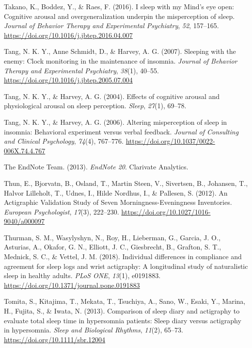\documentclass[
]{article}
\newlength{\cslhangindent}
\newenvironment{CSLReferences}[2] %
 {\begin{list}{}{%
  \setlength{\itemindent}{0pt}
  \setlength{\leftmargin}{0pt}
  \setlength{\parsep}{0pt}
  \ifodd #1
   \setlength{\leftmargin}{\cslhangindent}
   \setlength{\itemindent}{-1\cslhangindent}
  \fi
  \setlength{\itemsep}{#2\baselineskip}}}
 {\end{list}}
\begin{document}
\begin{CSLReferences}{1}{0}
Takano, K., Boddez, Y., \& Raes, F. (2016). I sleep with my {Mind}'s eye open: {Cognitive} arousal and overgeneralization underpin the misperception of sleep. \emph{Journal of Behavior Therapy and Experimental Psychiatry}, \emph{52}, 157--165. \url{https://doi.org/10.1016/j.jbtep.2016.04.007}

Tang, N. K. Y., Anne Schmidt, D., \& Harvey, A. G. (2007). Sleeping with the enemy: {Clock} monitoring in the maintenance of insomnia. \emph{Journal of Behavior Therapy and Experimental Psychiatry}, \emph{38}(1), 40--55. \url{https://doi.org/10.1016/j.jbtep.2005.07.004}

Tang, N. K. Y., \& Harvey, A. G. (2004). Effects of cognitive arousal and physiological arousal on sleep perception. \emph{Sleep}, \emph{27}(1), 69--78.

Tang, N. K. Y., \& Harvey, A. G. (2006). Altering misperception of sleep in insomnia: {Behavioral} experiment versus verbal feedback. \emph{Journal of Consulting and Clinical Psychology}, \emph{74}(4), 767--776. \url{https://doi.org/10.1037/0022-006X.74.4.767}

The EndNote Team. (2013). \emph{EndNote 20}. Clarivate Analytics.

Thun, E., Bjorvatn, B., Osland, T., Martin Steen, V., Sivertsen, B., Johansen, T., Halvor Lilleholt, T., Udnes, I., Hilde Nordhus, I., \& Pallesen, S. (2012). An {Actigraphic} {Validation} {Study} of {Seven} {Morningness}-{Eveningness} {Inventories}. \emph{European Psychologist}, \emph{17}(3), 222--230. \url{https://doi.org/10.1027/1016-9040/a000097}

Thurman, S. M., Wasylyshyn, N., Roy, H., Lieberman, G., Garcia, J. O., Asturias, A., Okafor, G. N., Elliott, J. C., Giesbrecht, B., Grafton, S. T., Mednick, S. C., \& Vettel, J. M. (2018). Individual differences in compliance and agreement for sleep logs and wrist actigraphy: {A} longitudinal study of naturalistic sleep in healthy adults. \emph{PLoS ONE}, \emph{13}(1), e0191883. \url{https://doi.org/10.1371/journal.pone.0191883}

Tomita, S., Kitajima, T., Mekata, T., Tsuchiya, A., Sano, W., Esaki, Y., Marina, H., Fujita, S., \& Iwata, N. (2013). Comparison of sleep diary and actigraphy to evaluate total sleep time in hypersomnia patients: {Sleep} diary versus actigraphy in hypersomnia. \emph{Sleep and Biological Rhythms}, \emph{11}(2), 65--73. \url{https://doi.org/10.1111/sbr.12004}


\end{CSLReferences}
\end{document}

